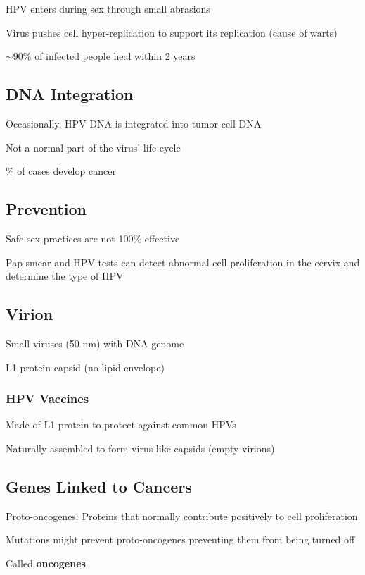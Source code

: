 \documentclass{notes}
\begin{document}
HPV enters during sex through small abrasions

Virus pushes cell hyper-replication to support its replication (cause of warts)

\(\sim\)90\% of infected people heal within 2 years

\subsection{DNA Integration}

Occasionally, HPV DNA is integrated into tumor cell DNA

\tab Not a normal part of the virus' life cycle

\% of cases develop cancer

\subsection{Prevention}

Safe sex practices are not 100\% effective

Pap smear and HPV tests can detect abnormal cell proliferation in the cervix and determine the type of HPV

\subsection{Virion}

Small viruses (50 nm) with DNA genome

L1 protein capsid (no lipid envelope)

\subsubsection{HPV Vaccines}

Made of L1 protein to protect against common HPVs

\tab \indicates Naturally assembled to form virus-like capsids (empty virions)

\subsection{Genes Linked to Cancers}

Proto-oncogenes: Proteins that normally contribute positively to cell proliferation

\tab Mutations might prevent proto-oncogenes preventing them from being turned off

\tab \indicates Called \textbf{oncogenes}
\end{document}
